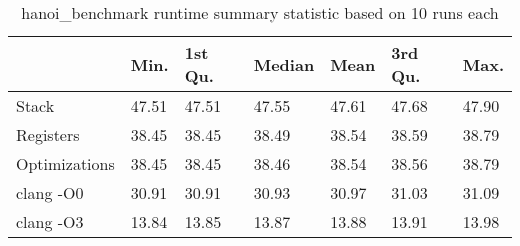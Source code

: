 \begin{table}[h!]
\centering
\begin{tabular}{p{}p{}p{}p{}p{}p{}p{}}
  \hline
 & Min. & 1st Qu. & Median & Mean & 3rd Qu. & Max. \\ 
  \hline
Stack & 47.51 & 47.51 & 47.55 & 47.61 & 47.68 & 47.90 \\ 
  Registers & 38.45 & 38.45 & 38.49 & 38.54 & 38.59 & 38.79 \\ 
  Optimizations & 38.45 & 38.45 & 38.46 & 38.54 & 38.56 & 38.79 \\ 
  clang -O0 & 30.91 & 30.91 & 30.93 & 30.97 & 31.03 & 31.09 \\ 
  clang -O3 & 13.84 & 13.85 & 13.87 & 13.88 & 13.91 & 13.98 \\ 
   \hline
\end{tabular}
\caption{hanoi\_benchmark runtime summary statistic based on 10 runs each}
\end{table}
